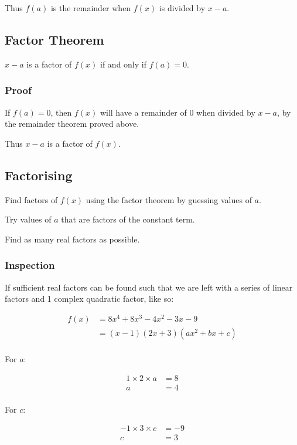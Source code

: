 \documentclass[a4paper,11pt]{article}
\begin{document}
Thus $f(a)$ is the remainder when $f(x)$ is divided by $x - a$.


\subsection{Factor Theorem}

$x - a$ is a factor of $f(x)$ if and only if $f(a) = 0$.


\subsubsection{Proof}

If $f(a) = 0$, then $f(x)$ will have a remainder of 0 when divided by $x - a$,
by the remainder theorem proved above.

Thus $x - a$ is a factor of $f(x)$.


\subsection{Factorising}

Find factors of $f(x)$ using the factor theorem by guessing values of $a$.

Try values of $a$ that are factors of the constant term.

Find as many real factors as possible.


\subsubsection{Inspection}

If sufficient real factors can be found such that we are left with a series of
linear factors and 1 complex quadratic factor, like so:

$$
\begin{aligned}
f(x) & = 8x^4 + 8x^3 - 4x^2 - 3x - 9 \\
& = (x - 1)(2x + 3)(ax^2 + bx + c) \\
\end{aligned}
$$

For $a$:

$$
\begin{aligned}
1 \times 2 \times a & = 8 \\
a & = 4 \\
\end{aligned}
$$

For $c$:

$$
\begin{aligned}
-1 \times 3 \times c & = -9 \\
c & = 3 \\
\end{aligned}
$$
\end{document}
